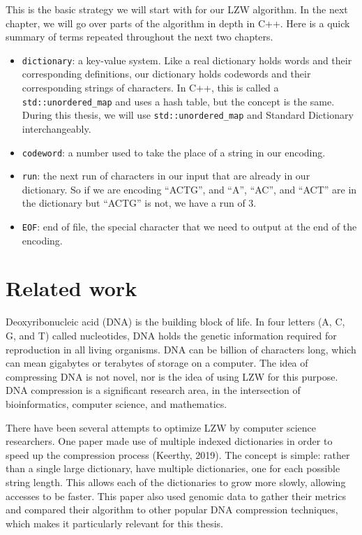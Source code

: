 \documentclass[12pt,twoside]{reedthesis}
\providecommand{\tightlist}{%
  \setlength{\itemsep}{0pt}\setlength{\parskip}{0pt}}
\begin{document}
This is the basic strategy we will start with for our LZW algorithm. In the next chapter, we will go over parts of the algorithm in depth in C++. Here is a quick summary of terms repeated throughout the next two chapters.
\begin{itemize}
\tightlist
\item
  \texttt{dictionary}: a key-value system. Like a real dictionary holds words and their corresponding definitions, our dictionary holds codewords and their corresponding strings of characters. In C++, this is called a \texttt{std::unordered\_map} and uses a hash table, but the concept is the same. During this thesis, we will use \texttt{std::unordered\_map} and Standard Dictionary interchangeably.
\item
  \texttt{codeword}: a number used to take the place of a string in our encoding.
\item
  \texttt{run}: the next run of characters in our input that are already in our dictionary. So if we are encoding ``ACTG'', and ``A'', ``AC'', and ``ACT'' are in the dictionary but ``ACTG'' is not, we have a run of 3.
\item
  \texttt{EOF}: end of file, the special character that we need to output at the end of the encoding.
\end{itemize}
\hypertarget{related-work}{%
\section{Related work}\label{related-work}}

Deoxyribonucleic acid (DNA) is the building block of life. In four letters (A, C, G, and T) called nucleotides, DNA holds the genetic information required for reproduction in all living organisms. DNA can be billion of characters long, which can mean gigabytes or terabytes of storage on a computer.
The idea of compressing DNA is not novel, nor is the idea of using LZW for this purpose. DNA compression is a significant research area, in the intersection of bioinformatics, computer science, and mathematics.

There have been several attempts to optimize LZW by computer science researchers. One paper made use of multiple indexed dictionaries in order to speed up the compression process (Keerthy, 2019). The concept is simple: rather than a single large dictionary, have multiple dictionaries, one for each possible string length. This allows each of the dictionaries to grow more slowly, allowing accesses to be faster. This paper also used genomic data to gather their metrics and compared their algorithm to other popular DNA compression techniques, which makes it particularly relevant for this thesis.
\end{document}

